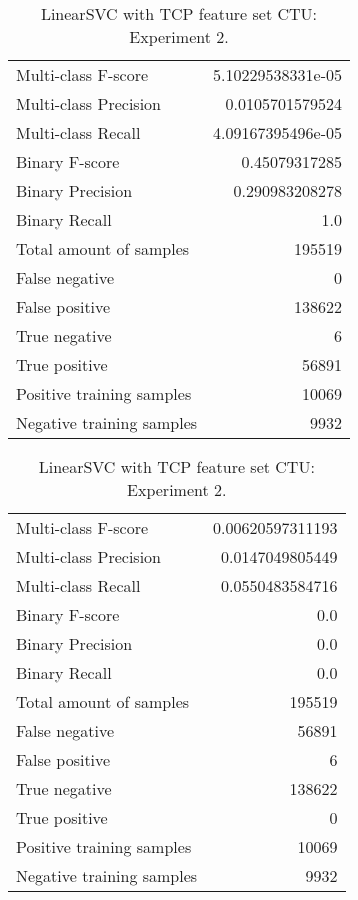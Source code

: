 \begin{table}[H]
\begin{minipage}{0.5\textwidth}
\caption{LinearSVC with TCP feature set CTU: Experiment 1.}
\centering
\begin{tabular}{l r}
\toprule
Multi-class F-score & 5.10229538331e-05 \\
Multi-class Precision & 0.0105701579524 \\
Multi-class Recall & 4.09167395496e-05 \\
\midrule
Binary F-score & 0.45079317285 \\
Binary Precision & 0.290983208278 \\
Binary Recall & 1.0 \\
\midrule
Total amount of samples & 195519 \\
False negative & 0 \\
False positive & 138622 \\
True negative & 6 \\
True positive & 56891 \\
\midrule
Positive training samples & 10069 \\
Negative training samples & 9932 \\
\bottomrule
\end{tabular}
\end{minipage}
\hfillx
\begin{minipage}{0.5\textwidth}
\caption{LinearSVC with TCP feature set CTU: Experiment 2.}
\centering
\begin{tabular}{l r}
\toprule
Multi-class F-score & 0.00620597311193 \\
Multi-class Precision & 0.0147049805449 \\
Multi-class Recall & 0.0550483584716 \\
\midrule
Binary F-score & 0.0 \\
Binary Precision & 0.0 \\
Binary Recall & 0.0 \\
\midrule
Total amount of samples & 195519 \\
False negative & 56891 \\
False positive & 6 \\
True negative & 138622 \\
True positive & 0 \\
\midrule
Positive training samples & 10069 \\
Negative training samples & 9932 \\
\bottomrule
\end{tabular}
\end{minipage}
\end{table}
